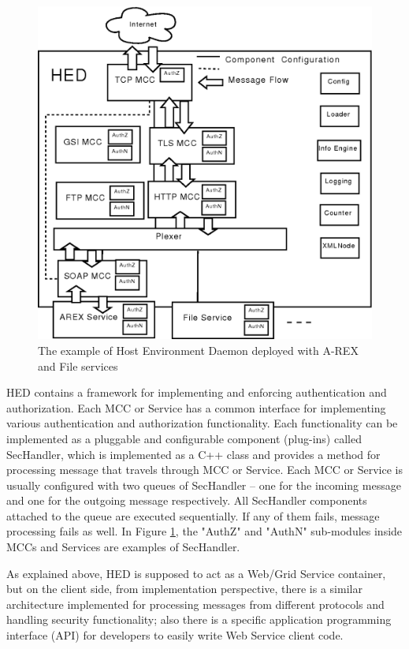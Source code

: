 \documentclass[twocolumn]{svjour3}         %
\begin{document}
\begin{figure}
\includegraphics[width=0.9\columnwidth]{HED.png}
\caption{The example of Host Environment Daemon deployed with A-REX and File services}
\label{fig:HED}
\end{figure}
HED contains a framework for implementing and enforcing authentication and authorization. Each MCC or Service has a common interface for implementing various authentication and authorization functionality. Each functionality can be implemented as a pluggable and configurable component (plug-ins) called SecHandler, which is implemented as a C++ class and provides a method for processing message that travels through MCC or Service. Each MCC or Service is usually configured with two queues of SecHandler – one for the incoming message and one for the outgoing message respectively. All SecHandler components attached to the queue are executed sequentially. If any of them fails, message processing fails as well. In Figure \ref{fig:HED}, the "AuthZ" and "AuthN" sub-modules inside MCCs and Services are examples of SecHandler.

As explained above, HED is supposed to act as a Web/Grid Service container, but on the client side, from implementation perspective, there is a similar architecture implemented for processing messages from different protocols and handling security functionality; also there is a specific application programming interface (API) for developers to easily write Web Service client code.
\end{document}
